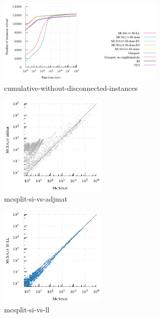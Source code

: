 \begin{figure}[h!]
    \centering
    \includegraphics*[width=0.7\textwidth]{14b-mcsplit-induced-si/decision-instances-experiment/experiment/plots/cumulative-without-disconnected-instances}
    \caption{cumulative-without-disconnected-instances}
    \label{figure:cumulative-without-disconnected-instances}
\end{figure}

\begin{figure}[h!]
    \centering
    \includegraphics*[width=0.45\textwidth]{14b-mcsplit-induced-si/decision-instances-experiment/experiment/plots/mcsplit-si-vs-adjmat}
    \caption{mcsplit-si-vs-adjmat}
    \label{figure:mcsplit-si-vs-adjmat}
\end{figure}

\begin{figure}[h!]
    \centering
    \includegraphics*[width=0.45\textwidth]{14b-mcsplit-induced-si/decision-instances-experiment/experiment/plots/mcsplit-si-vs-ll}
    \caption{mcsplit-si-vs-ll}
    \label{figure:mcsplit-si-vs-ll}
\end{figure}

